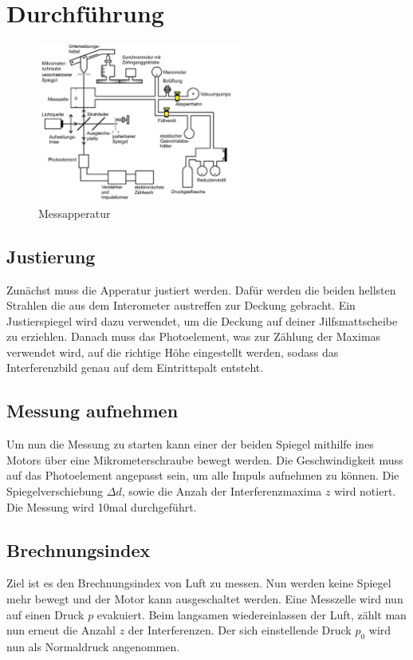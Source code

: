 \section{Durchführung}
\label{sec:Durchfuehrung}
\begin{figure}
    \centering
    \includegraphics[width=0.6\textwidth]{bilder/aufbau.jpg}
    \caption{Messapperatur \cite[9]{anleitung}}
\end{figure}
\subsection{Justierung}
Zunächst muss die Apperatur justiert werden. Dafür werden die beiden hellsten Strahlen die aus dem
Interometer austreffen zur Deckung gebracht. Ein Justierspiegel wird dazu verwendet, um die Deckung auf deiner Jilfsmattscheibe zu erziehlen.
Danach muss das Photoelement, was zur Zählung der Maximas verwendet wird, auf die richtige Höhe 
eingestellt werden, sodass das Interferenzbild genau auf dem Eintrittspalt entsteht.\\
\subsection{Messung aufnehmen}
Um nun die Messung zu starten kann einer der beiden Spiegel mithilfe ines Motors über eine
Mikrometerschraube bewegt werden. Die Geschwindigkeit muss auf das Photoelement angepasst sein, um alle Impuls aufnehmen zu können.
Die Spiegelverschiebung $\Delta d$, sowie die Anzah der Interferenzmaxima $z$ wird notiert.
Die Messung wird 10mal durchgeführt.
\subsection{Brechnungsindex}
Ziel ist es den Brechnungsindex von Luft zu messen. Nun werden keine Spiegel mehr bewegt und der
Motor kann ausgeschaltet werden. Eine Messzelle wird nun auf einen Druck $p$ evakuiert.
Beim langsamen wiedereinlassen der Luft, zählt man nun erneut die Anzahl $z$ der Interferenzen.
Der sich einstellende Druck $p_0$ wird nun als Normaldruck angenommen.
